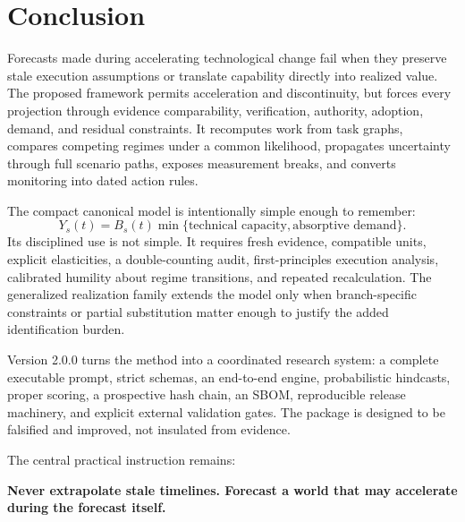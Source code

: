 \section{Conclusion}

Forecasts made during accelerating technological change fail when they preserve stale execution assumptions or translate capability directly into realized value. The proposed framework permits acceleration and discontinuity, but forces every projection through evidence comparability, verification, authority, adoption, demand, and residual constraints. It recomputes work from task graphs, compares competing regimes under a common likelihood, propagates uncertainty through full scenario paths, exposes measurement breaks, and converts monitoring into dated action rules.

The compact canonical model is intentionally simple enough to remember:
\[
Y_s(t)=B_s(t)\min\{\text{technical capacity},\text{absorptive demand}\}.
\]
Its disciplined use is not simple. It requires fresh evidence, compatible units, explicit elasticities, a double-counting audit, first-principles execution analysis, calibrated humility about regime transitions, and repeated recalculation. The generalized realization family extends the model only when branch-specific constraints or partial substitution matter enough to justify the added identification burden.

Version 2.0.0 turns the method into a coordinated research system: a complete executable prompt, strict schemas, an end-to-end engine, probabilistic hindcasts, proper scoring, a prospective hash chain, an SBOM, reproducible release machinery, and explicit external validation gates. The package is designed to be falsified and improved, not insulated from evidence.

The central practical instruction remains:

\begin{keybox}
\centering\large\bfseries
Never extrapolate stale timelines. Forecast a world that may accelerate during the forecast itself.
\end{keybox}
